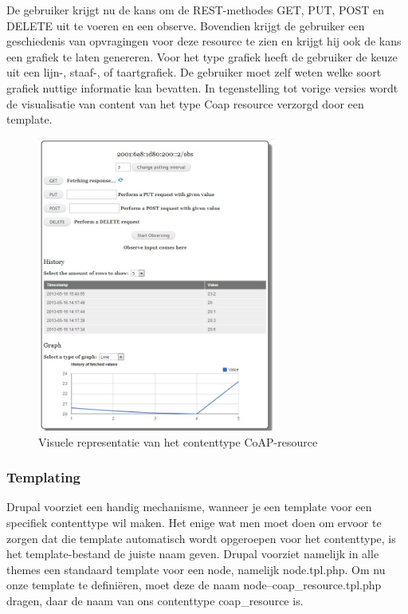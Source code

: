 De gebruiker krijgt nu de kans om de REST-methodes  GET, PUT, POST en DELETE uit te voeren en een observe. Bovendien krijgt de gebruiker een geschiedenis van opvragingen voor deze resource te zien en krijgt hij ook de kans een grafiek te laten genereren. Voor het type grafiek heeft de gebruiker de keuze uit een lijn-, staaf-, of taartgrafiek. De gebruiker moet zelf weten welke soort grafiek nuttige informatie kan bevatten. In tegenstelling tot vorige versies wordt de visualisatie van content van het type Coap resource verzorgd door een template.
\begin{figure}[h!]
\centering
\includegraphics[width=0.7\textwidth]{fig/coap_resource}
\caption{Visuele representatie van het contenttype CoAP-resource}
\label{fig:coapResource}
\end{figure}

\subsubsection{Templating}\label{templating}
Drupal voorziet een handig mechanisme, wanneer je een template voor een specifiek contenttype wil maken. Het enige wat men moet doen om ervoor te zorgen dat die template automatisch wordt opgeroepen voor het contenttype, is het template-bestand de juiste naam geven. Drupal voorziet namelijk in alle themes een standaard template voor een node, namelijk node.tpl.php. Om nu onze template te defini\"{e}ren, moet deze de naam node--coap\_resource.tpl.php dragen, daar de naam van ons contenttype coap\_resource is.\\

